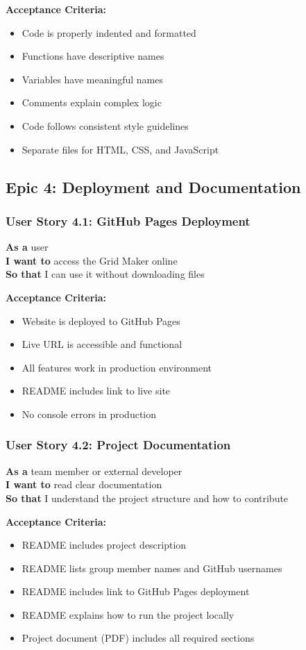 \documentclass[11pt,a4paper]{article}
\begin{document}
\textbf{Acceptance Criteria:}
\begin{itemize}[leftmargin=*]
    \item Code is properly indented and formatted
    \item Functions have descriptive names
    \item Variables have meaningful names
    \item Comments explain complex logic
    \item Code follows consistent style guidelines
    \item Separate files for HTML, CSS, and JavaScript
\end{itemize}

\subsection{Epic 4: Deployment and Documentation}

\subsubsection{User Story 4.1: GitHub Pages Deployment}
\textbf{As a} user\\
\textbf{I want to} access the Grid Maker online\\
\textbf{So that} I can use it without downloading files

\textbf{Acceptance Criteria:}
\begin{itemize}[leftmargin=*]
    \item Website is deployed to GitHub Pages
    \item Live URL is accessible and functional
    \item All features work in production environment
    \item README includes link to live site
    \item No console errors in production
\end{itemize}

\subsubsection{User Story 4.2: Project Documentation}
\textbf{As a} team member or external developer\\
\textbf{I want to} read clear documentation\\
\textbf{So that} I understand the project structure and how to contribute

\textbf{Acceptance Criteria:}
\begin{itemize}[leftmargin=*]
    \item README includes project description
    \item README lists group member names and GitHub usernames
    \item README includes link to GitHub Pages deployment
    \item README explains how to run the project locally
    \item Project document (PDF) includes all required sections
\end{itemize}
\end{document}
